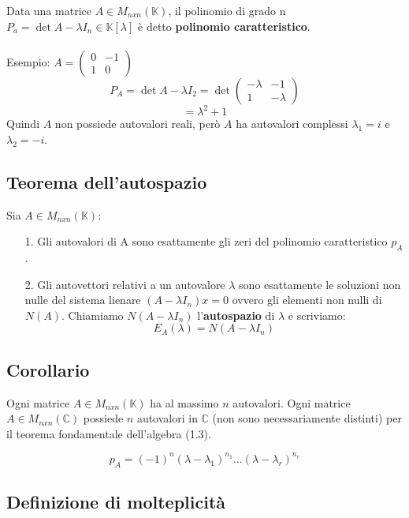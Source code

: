 \documentclass[12pt]{article}
\begin{document}
Data una matrice $A \in M_{nxn} (\mathbb{K})$, il polinomio di grado n $P_a = \det{A - \lambda I_n} \in \mathbb{K}[\lambda]$ è detto \textbf{polinomio caratteristico}.\\\\
Esempio:
$A = \begin{pmatrix}
    0 & -1\\
    1 & 0
\end{pmatrix}$
\[P_A = \det{A - \lambda I_2} = \det{\begin{pmatrix}
    -\lambda & -1\\
    1 & -\lambda
\end{pmatrix}}\]
\[= \lambda^2 + 1\]
Quindi $A$ non possiede autovalori reali, però $A$ ha autovalori complessi $\lambda_1 = i$ e $\lambda_2 = -i$.

\subsection{Teorema dell'autospazio}

Sia $A \in M_{nxn}(\mathbb{K})$:

\begin{enumerate}
    \item[1.] Gli autovalori di A sono esattamente gli zeri del polinomio caratteristico $p_A$.
    \item[2.] Gli autovettori relativi a un autovalore $\lambda$ sono esattamente le soluzioni non nulle del sistema lienare $(A - \lambda I_n)x = 0$ ovvero gli elementi non nulli di $N(A)$. Chiamiamo $N(A - \lambda I_n)$ l'\textbf{autospazio} di $\lambda$ e scriviamo:
    \[E_A(\lambda) = N(A-\lambda I_n)\]
\end{enumerate}

\subsection{Corollario}

Ogni matrice $A \in M_{nxn} (\mathbb{K})$ ha al massimo $n$ autovalori. Ogni matrice $A \in M_{nxn} (\mathbb{C})$ possiede $n$ autovalori in $\mathbb{C}$ (non sono necessariamente distinti) per il teorema fondamentale dell'algebra (1.3).

\[p_A = (-1)^n(\lambda - \lambda_1)^{n_1} \dots (\lambda - \lambda_r)^{n_r}\]

\subsection{Definizione di molteplicità}
\end{document}
